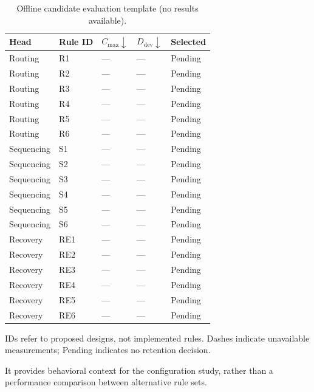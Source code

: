 \begin{table}[t]
\centering
\caption{Offline candidate evaluation template (no results available).}
\label{tab:offline_rule_screening}
\footnotesize
\setlength{\tabcolsep}{3pt}
\begin{tabular*}{\linewidth}{@{\extracolsep{\fill}}lllll@{}}
\toprule
Head & Rule ID & $C_{\max}\downarrow$ & $D_{\mathrm{dev}}\downarrow$ & Selected \\
\midrule
Routing & R1 & --- & --- & Pending \\
Routing & R2 & --- & --- & Pending \\
Routing & R3 & --- & --- & Pending \\
Routing & R4 & --- & --- & Pending \\
Routing & R5 & --- & --- & Pending \\
Routing & R6 & --- & --- & Pending \\
\midrule
Sequencing & S1 & --- & --- & Pending \\
Sequencing & S2 & --- & --- & Pending \\
Sequencing & S3 & --- & --- & Pending \\
Sequencing & S4 & --- & --- & Pending \\
Sequencing & S5 & --- & --- & Pending \\
Sequencing & S6 & --- & --- & Pending \\
\midrule
Recovery & RE1 & --- & --- & Pending \\
Recovery & RE2 & --- & --- & Pending \\
Recovery & RE3 & --- & --- & Pending \\
Recovery & RE4 & --- & --- & Pending \\
Recovery & RE5 & --- & --- & Pending \\
Recovery & RE6 & --- & --- & Pending \\
\bottomrule
\end{tabular*}
\par\smallskip
\parbox{\columnwidth}{\footnotesize IDs refer to proposed designs, not implemented rules.
Dashes indicate unavailable measurements; Pending indicates no retention decision.}
\end{table}


It provides behavioral context for the configuration study, rather than a performance comparison between alternative rule sets.

